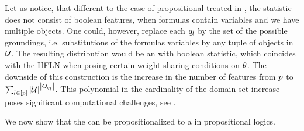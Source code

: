 
Let us notice, that different to the case of propositional \HybridLogicNetworks{} treated in , the statistic does not consist of boolean features, when formulas contain variables and we have multiple objects.
One could, however, replace each $q_{l}$ by the set of the possible groundings, i.e. substitutions of the formulas variables by any tuple of objects in $\mathcal{U}$.
The resulting distribution would be an \HybridLogicNetwork{} with boolean statistic, which coincides with the HFLN when posing certain weight sharing conditions on $\theta$.
The downside of this construction is the increase in the number of features from $p$ to $\sum_{l\in[p]} \left|\mathcal{U}\right|^{\left|O_{q_{l}}\right|}$.
This polynomial in the cardinality of the domain set increase poses significant computational challenges, see \cite{richardson_markov_2006}.

We now show that the \HybridFOLNetwork{} can be propositionalized to a \HybridLogicNetwork{} in propositional logics.

